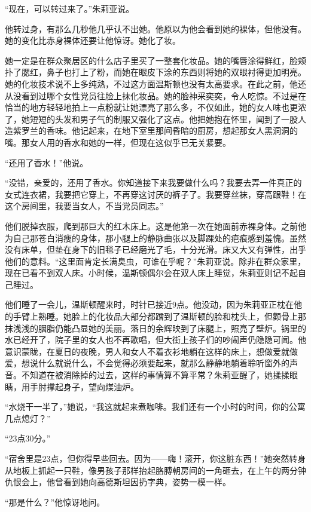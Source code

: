 ``现在，可以转过来了。''朱莉亚说。

他转过身，有那么几秒他几乎认不出她。他原以为他会看到她的裸体，但他没有。她的变化比赤身裸体还要让他惊讶。她化了妆。

她一定是在群众聚居区的什么店子里买了一整套化妆品。她的嘴唇涂得鲜红，脸颊扑了腮红，鼻子也打上了粉，而她在眼皮下涂的东西则将她的双眼衬得更加明亮。她的化妆技术说不上多纯熟，不过这方面温斯顿也没有太高要求。在此之前，他还从没看到过哪个女性党员往脸上抹化妆品。她的脸神采奕奕，令人吃惊。不过是在恰当的地方轻轻地拍上一点粉就让她漂亮了那么多，不仅如此，她的女人味也更浓了，她短短的头发和男子气的制服又强化了这点。他把她抱在怀里，闻到了一股人造紫罗兰的香味。他记起来，在地下室里那间昏暗的厨房，想起那女人黑洞洞的嘴。那女人用的香水和她的一样，但现在这似乎已无关紧要。

``还用了香水！''他说。

``没错，亲爱的，还用了香水。你知道接下来我要做什么吗？我要去弄一件真正的女式连衣裙，我要把它穿上，不再穿这讨厌的裤子了。我要穿丝袜，穿高跟鞋！在这个房间里，我要当女人，不当党员同志。''

他们脱掉衣服，爬到那巨大的红木床上。这是他第一次在她面前赤裸身体。之前他为自己那苍白消瘦的身体，那小腿上的静脉曲张以及脚踝处的疤痕感到羞愧。虽然没有床单，但垫在身下的旧毯子已经磨光了毛，十分光滑。床又大又有弹性，出乎他们的意料。``这里面肯定长满臭虫，可谁在乎呢？''朱莉亚说。除非在群众家里，现在已看不到双人床。小时候，温斯顿偶尔会在双人床上睡觉，朱莉亚则记不起自己睡过。

他们睡了一会儿，温斯顿醒来时，时针已接近9点。他没动，因为朱莉亚正枕在他的手臂上熟睡。她脸上的化妆品大部分都蹭到了温斯顿的脸和枕头上，但颧骨上那抹浅浅的胭脂仍能凸显她的美丽。落日的余辉映到了床腿上，照亮了壁炉。锅里的水已经开了，院子里的女人也不再歌唱，但大街上孩子们的吵闹声仍隐隐可闻。他意识蒙眬，在夏日的夜晚，男人和女人不着衣衫地躺在这样的床上，想做爱就做爱，想说什么就说什么，不会觉得必须要起来，就那么静静地躺着聆听窗外的声音。不知道在被消除掉的过去，这样的事情算不算平常？朱莉亚醒了，她揉揉眼睛，用手肘撑起身子，望向煤油炉。

``水烧干一半了，''她说，``我这就起来煮咖啡。我们还有一个小时的时间，你的公寓几点熄灯？''

``23点30分。''

``宿舍里是23点，但你得早些回去。因为------嗨！滚开，你这脏东西！''她突然转身从地板上抓起一只鞋，像男孩子那样抬起胳膊朝房间的一角砸去，在上午的两分钟仇恨会上，他曾看到她向高德斯坦因扔字典，姿势一模一样。

``那是什么？''他惊讶地问。

